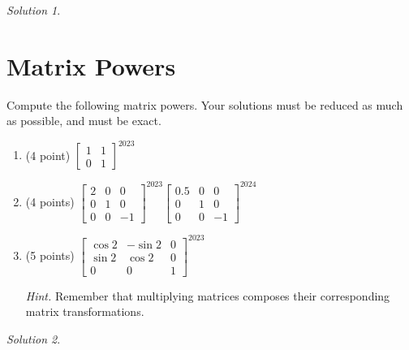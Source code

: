 \documentclass{article}
\theoremstyle{remark}
\newtheorem*{solution}{Solution}
\begin{document}
\medskip

\begin{solution}
\end{solution}

\pagebreak
\section{Matrix Powers}
Compute the following matrix powers.
Your solutions must be reduced as much as possible, and must be exact.

\begin{enumerate}
\item (4 point)
  $
  \begin{bmatrix}
    1 & 1 \\
    0 & 1
  \end{bmatrix}^{2023}
  $
\item (4 points)
  $
  \begin{bmatrix}
    2 & 0 & 0 \\
    0 & 1 & 0 \\
    0 & 0 & -1
  \end{bmatrix}^{2023}
  \begin{bmatrix}
    0.5 & 0 & 0 \\
    0 & 1 & 0 \\
    0 & 0 & -1
  \end{bmatrix}^{2024}
  $
\item (5 points)
  $
  \begin{bmatrix}
    \cos2 & -\sin2 & 0 \\
    \sin2 & \cos2 & 0 \\
    0 & 0 & 1
  \end{bmatrix}^{2023}
  $
  \hfill

  \noindent\textit{Hint.} Remember that multiplying matrices composes their corresponding matrix transformations.
\end{enumerate}

\medskip

\begin{solution}
\end{solution}

\pagebreak
\end{document}
